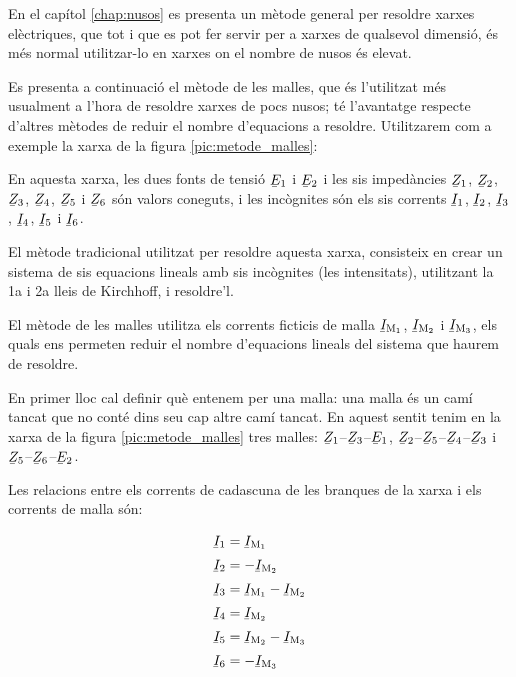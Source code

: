 En el capítol \ref{chap:nusos} es presenta un mètode general per resoldre xarxes elèctriques, que tot i que es pot fer servir per a xarxes de qualsevol dimensió, és més normal utilitzar-lo en xarxes on el nombre de nusos és elevat.

Es presenta a continuació el mètode de les malles, que és l'utilitzat més usualment a l'hora de resoldre xarxes de pocs nusos; té l'avantatge respecte d'altres mètodes de reduir el nombre d'equacions a resoldre. Utilitzarem com a exemple la xarxa de la figura \vref{pic:metode_malles}:

\begin{center}
    
     \label{pic:metode_malles}
\end{center}

En aquesta xarxa, les dues fonts de tensió $\cmplx{E}_1$ i $\cmplx{E}_2$ i les sis impedàncies $\cmplx{Z}_1$, $\cmplx{Z}_2$, $\cmplx{Z}_3$, $\cmplx{Z}_4$, $\cmplx{Z}_5$ i $\cmplx{Z}_6$  són valors coneguts, i les incògnites són els sis corrents $\cmplx{I}_1$, $\cmplx{I}_2$, $\cmplx{I}_3$, $\cmplx{I}_4$, $\cmplx{I}_5$ i $\cmplx{I}_6$.

El mètode tradicional utilitzat per  resoldre aquesta xarxa, consisteix en crear un sistema  de sis equacions lineals amb sis incògnites (les intensitats), utilitzant  la 1a i 2a lleis de Kirchhoff, i resoldre'l.

El mètode de les malles utilitza els corrents ficticis de malla $\cmplx{I}\ped{M_1}$, $\cmplx{I}\ped{M_2}$ i $\cmplx{I}\ped{M_3}$, els quals ens permeten reduir el nombre d'equacions lineals del  sistema que haurem de resoldre.



En primer lloc cal definir què entenem per una malla: una malla és un camí tancat que no conté dins seu cap altre camí tancat. En aquest sentit tenim en la xarxa de la figura \vref{pic:metode_malles} tres malles: $\cmplx{Z}_1$--$\cmplx{Z}_3$--$\cmplx{E}_1$, $\cmplx{Z}_2$--$\cmplx{Z}_5$--$\cmplx{Z}_4$--$\cmplx{Z}_3$ i $\cmplx{Z}_5$--$\cmplx{Z}_6$--$\cmplx{E}_2$.

Les relacions entre els corrents de cadascuna de les branques de la xarxa i els corrents de malla són:

\begin{subequations}
\begin{align}
    \cmplx{I}_1 &= \cmplx{I}\ped{M_1} \label{eq:malles1} \\[0.5ex]
    \cmplx{I}_2 &= -\cmplx{I}\ped{M_2} \\[0.5ex]
    \cmplx{I}_3 &= \cmplx{I}\ped{M_1}-\cmplx{I}\ped{M_2} \\[0.5ex]
    \cmplx{I}_4 &= \cmplx{I}\ped{M_2} \\[0.5ex]
    \cmplx{I}_5 &= \cmplx{I}\ped{M_2}-\cmplx{I}\ped{M_3} \\[0.5ex]
    \cmplx{I}_6 &= -\cmplx{I}\ped{M_3} \label{eq:malles2}
\end{align}
\end{subequations}

